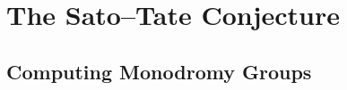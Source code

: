 \documentclass[../thesis.tex]{subfiles}
\begin{document}
\chapter{The Sato--Tate Conjecture}

\section{Computing Monodromy Groups} \label{sec:compute-gl-from-gl0}
\end{document}
